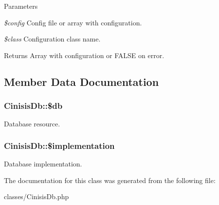 \begin{DoxyParams}{Parameters}
\item[{\em \$config}]Config file or array with configuration.\item[{\em \$class}]Configuration class name.\end{DoxyParams}
\begin{DoxyReturn}{Returns}
Array with configuration or FALSE on error. 
\end{DoxyReturn}


\subsection{Member Data Documentation}
\hypertarget{classCinisisDb_af5032dd536f8b50a71871dd35c8be175}{
\subsubsection[{\$db}]{\setlength{\rightskip}{0pt plus 5cm}CinisisDb::\$db}}
\label{classCinisisDb_af5032dd536f8b50a71871dd35c8be175}
Database resource. \hypertarget{classCinisisDb_af236be4b737a41fff5e97cf4471f1c00}{
\subsubsection[{\$implementation}]{\setlength{\rightskip}{0pt plus 5cm}CinisisDb::\$implementation}}
\label{classCinisisDb_af236be4b737a41fff5e97cf4471f1c00}
Database implementation. 

The documentation for this class was generated from the following file:\begin{DoxyCompactItemize}
\item 
classes/CinisisDb.php\end{DoxyCompactItemize}
